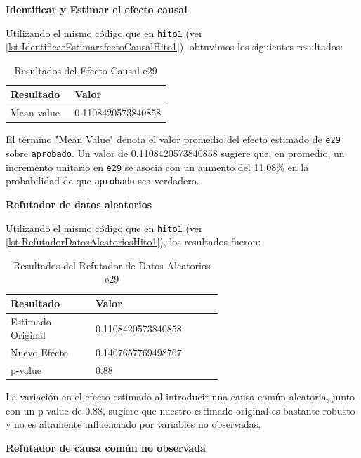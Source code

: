 \textbf{Identificar y Estimar el efecto causal}

Utilizando el mismo código que en \texttt{hito1} (ver \ref{lst:IdentificarEstimarefectoCausalHito1}), obtuvimos los siguientes resultados:

\begin{table}[H]
    \centering        
    \begin{tabular}{lp{0.6\linewidth}}
        \toprule
        \textbf{Resultado} & \textbf{Valor} \\
        \midrule
        Mean value & 0.1108420573840858 \\
        \bottomrule
    \end{tabular}
    \caption{Resultados del Efecto Causal e29}
    \label{tab:efecto_causal_e29}
\end{table}

El término "Mean Value" denota el valor promedio del efecto estimado de \texttt{e29} sobre \texttt{aprobado}. Un valor de 0.1108420573840858 sugiere que, en promedio, un incremento unitario en \texttt{e29} se asocia con un aumento del 11.08\% en la probabilidad de que \texttt{aprobado} sea verdadero.

\textbf{Refutador de datos aleatorios}

Utilizando el mismo código que en \texttt{hito1} (ver \ref{lst:RefutadorDatosAleatoriosHito1}), los resultados fueron:

\begin{table}[H]
    \centering        
    \begin{tabular}{lp{0.6\linewidth}}
        \toprule
        \textbf{Resultado} & \textbf{Valor} \\
        \midrule
        Estimado Original & 0.1108420573840858 \\
        Nuevo Efecto & 0.1407657769498767 \\
        p-value & 0.88 \\
        \bottomrule
    \end{tabular}
    \caption{Resultados del Refutador de Datos Aleatorios e29}
    \label{tab:refutador_datos_aleatorios_e29}
\end{table}

La variación en el efecto estimado al introducir una causa común aleatoria, junto con un p-value de 0.88, sugiere que nuestro estimado original es bastante robusto y no es altamente influenciado por variables no observadas.

\textbf{Refutador de causa común no observada}

